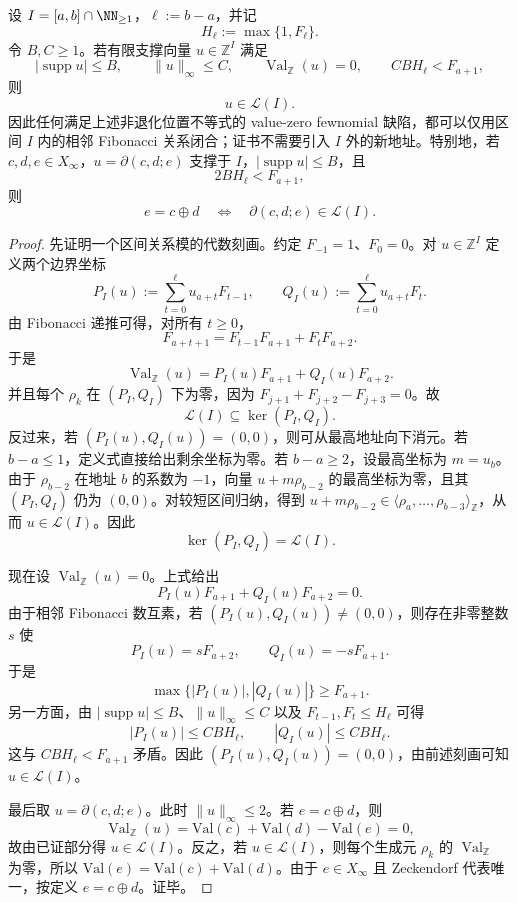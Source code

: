 \begin{theorem}\label{distill:khovanskii_newton_polyhedra_fewnomials_and_tropical_skeletons-fewnomial_budget_bounds-finite-active-address-internal-closure}
设 \(I=[a,b]\cap\NN_{\ge1}\)，\(\ell:=b-a\)，并记
\[
 H_\ell:=\max\{1,F_\ell\}.
\]
令 \(B,C\ge1\)。若有限支撑向量 \(u\in\mathbb Z^I\) 满足
\[
 |\operatorname{supp}u|\le B,\qquad \|u\|_\infty\le C,\qquad
 \operatorname{Val}_{\mathbb Z}(u)=0,\qquad
 C B H_\ell < F_{a+1},
\]
则
\[
 u\in\mathcal L(I).
\]
因此任何满足上述非退化位置不等式的 value-zero fewnomial 缺陷，都可以仅用区间 \(I\) 内的相邻 Fibonacci 关系闭合；证书不需要引入 \(I\) 外的新地址。特别地，若 \(c,d,e\in X_\infty\)，\(u=\partial(c,d;e)\) 支撑于 \(I\)，\(|\operatorname{supp}u|\le B\)，且
\[
 2B H_\ell < F_{a+1},
\]
则
\[
 e=c\oplus d
 \quad\Longleftrightarrow\quad
 \partial(c,d;e)\in\mathcal L(I).
\]
\end{theorem}
\begin{proof}
先证明一个区间关系模的代数刻画。约定 \(F_{-1}=1\)、\(F_0=0\)。对 \(u\in\mathbb Z^I\) 定义两个边界坐标
\[
 P_I(u):=\sum_{t=0}^{\ell}u_{a+t}F_{t-1},\qquad
 Q_I(u):=\sum_{t=0}^{\ell}u_{a+t}F_t.
\]
由 Fibonacci 递推可得，对所有 \(t\ge0\)，
\[
 F_{a+t+1}=F_{t-1}F_{a+1}+F_tF_{a+2}.
\]
于是
\[
 \operatorname{Val}_{\mathbb Z}(u)=P_I(u)F_{a+1}+Q_I(u)F_{a+2}.
\]
并且每个 \(\rho_k\) 在 \((P_I,Q_I)\) 下为零，因为 \(F_{j+1}+F_{j+2}-F_{j+3}=0\)。故
\[
 \mathcal L(I)\subseteq \ker(P_I,Q_I).
\]
反过来，若 \((P_I(u),Q_I(u))=(0,0)\)，则可从最高地址向下消元。若 \(b-a\le1\)，定义式直接给出剩余坐标为零。若 \(b-a\ge2\)，设最高坐标为 \(m=u_b\)。由于 \(\rho_{b-2}\) 在地址 \(b\) 的系数为 \(-1\)，向量 \(u+m\rho_{b-2}\) 的最高坐标为零，且其 \((P_I,Q_I)\) 仍为 \((0,0)\)。对较短区间归纳，得到 \(u+m\rho_{b-2}\in\langle \rho_a,\ldots,\rho_{b-3}\rangle_{\mathbb Z}\)，从而 \(u\in\mathcal L(I)\)。因此
\[
 \ker(P_I,Q_I)=\mathcal L(I).
\]

现在设 \(\operatorname{Val}_{\mathbb Z}(u)=0\)。上式给出
\[
 P_I(u)F_{a+1}+Q_I(u)F_{a+2}=0.
\]
由于相邻 Fibonacci 数互素，若 \((P_I(u),Q_I(u))\ne(0,0)\)，则存在非零整数 \(s\) 使
\[
 P_I(u)=sF_{a+2},\qquad Q_I(u)=-sF_{a+1}.
\]
于是
\[
 \max\{|P_I(u)|,|Q_I(u)|\}\ge F_{a+1}.
\]
另一方面，由 \(|\operatorname{supp}u|\le B\)、\(\|u\|_\infty\le C\) 以及 \(F_{t-1},F_t\le H_\ell\) 可得
\[
 |P_I(u)|\le C B H_\ell,\qquad |Q_I(u)|\le C B H_\ell.
\]
这与 \(CBH_\ell<F_{a+1}\) 矛盾。因此 \((P_I(u),Q_I(u))=(0,0)\)，由前述刻画可知 \(u\in\mathcal L(I)\)。

最后取 \(u=\partial(c,d;e)\)。此时 \(\|u\|_\infty\le2\)。若 \(e=c\oplus d\)，则
\[
 \operatorname{Val}_{\mathbb Z}(u)=\mathrm{Val}(c)+\mathrm{Val}(d)-\mathrm{Val}(e)=0,
\]
故由已证部分得 \(u\in\mathcal L(I)\)。反之，若 \(u\in\mathcal L(I)\)，则每个生成元 \(\rho_k\) 的 \(\operatorname{Val}_{\mathbb Z}\) 为零，所以 \(\mathrm{Val}(e)=\mathrm{Val}(c)+\mathrm{Val}(d)\)。由于 \(e\in X_\infty\) 且 Zeckendorf 代表唯一，按定义 \(e=c\oplus d\)。证毕。
\end{proof}

